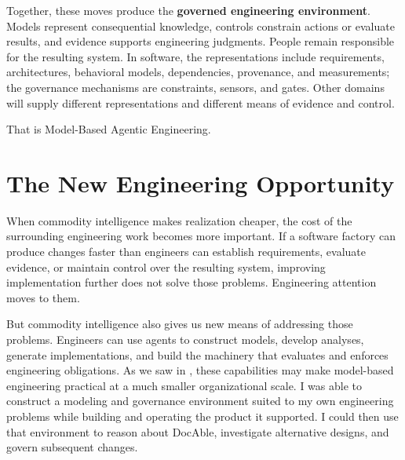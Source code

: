 
Together, these moves produce the \textbf{governed engineering environment}. Models represent consequential knowledge, controls constrain actions or evaluate results, and evidence supports engineering judgments. People remain responsible for the resulting system. In software, the representations include requirements, architectures, behavioral models, dependencies, provenance, and measurements; the governance mechanisms are constraints, sensors, and gates. Other domains will supply different representations and different means of evidence and control.

That is Model-Based Agentic Engineering.

\section{The New Engineering Opportunity}\label{heading:what-changes-next}

When commodity intelligence makes realization cheaper, the cost of the surrounding engineering work becomes more important. If a software factory can produce changes faster than engineers can establish requirements, evaluate evidence, or maintain control over the resulting system, improving implementation further does not solve those problems. Engineering attention moves to them.

But commodity intelligence also gives us new means of addressing those problems. Engineers can use agents to construct models, develop analyses, generate implementations, and build the machinery that evaluates and enforces engineering obligations. As we saw in , these capabilities may make model-based engineering practical at a much smaller organizational scale. I was able to construct a modeling and governance environment suited to my own engineering problems while building and operating the product it supported. I could then use that environment to reason about DocAble, investigate alternative designs, and govern subsequent changes.

